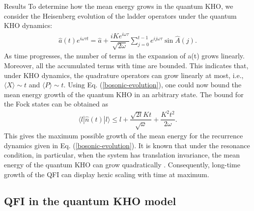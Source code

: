\documentclass[amsmath,nobibnotes,aps,amssymb,pra, prl,aps,showpacs,superscriptaddress,twocolumn, longbibliography, reprint]{revtex4-2}
\begin{document}
\begin{section}{Results}
To determine how the mean energy grows in the quantum KHO, we consider the Heisenberg evolution of the ladder operators under the quantum KHO dynamics: 
\begin{eqnarray}\label{bosonic-evolution}
\hat{a}(t)e^{i\omega\tau t}=\hat{a}+\dfrac{iKe^{i\omega\tau}}{\sqrt{2\omega}}\sum_{j=0}^{t-1}e^{ij\omega\tau}\sin \hat{A}(j).
\end{eqnarray}
As time progresses, the number of terms in the expansion of a(t) grows linearly. Moreover, all the accumulated terms with time are bounded. This indicates that, under KHO dynamics, the quadrature operators can grow linearly at most, i.e., $\langle X\rangle\sim t$ and $\langle P\rangle\sim t$. Using Eq. (\ref{bosonic-evolution}), one could now bound the mean energy growth of the quantum KHO in an arbitrary state. The bound for the Fock states can be obtained as
\begin{eqnarray}\label{energy-bound}
\langle l|\hat{n}(t)|l\rangle\leq l+\dfrac{\sqrt{2l}Kt}{\sqrt{\omega}}+\dfrac{K^2t^2}{2\omega}. 
\end{eqnarray}
This gives the maximum possible growth of the mean energy for the recurrence dynamics given in Eq. (\ref{bosonic-evolution}). It is known that under the resonance condition, in particular, when the system has translation invariance, the mean energy of the quantum KHO can grow quadratically \cite{borgonovi1995translational}. Consequently, long-time growth of the QFI can display hexic scaling with time at maximum. 






\subsection{QFI in the quantum KHO model}
\label{section-3C}


\end{section}
\end{document}

